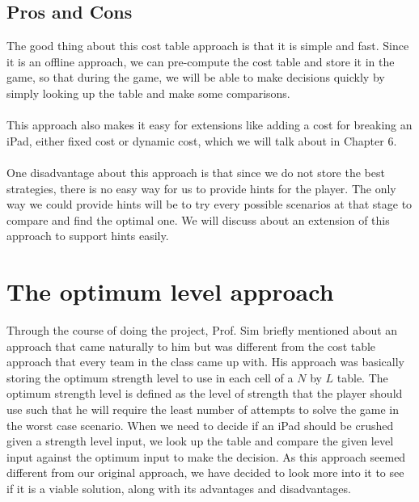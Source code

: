 \documentclass[12pt,a4paper,oneside]{report}
\begin{document}
\section{Pros and Cons}
The good thing about this cost table approach is that it is simple and fast. Since it is an offline approach, we can pre-compute the cost table and store it in the game, so that during the game, we will be able to make decisions quickly by simply looking up the table and make some comparisons. \\\\
This approach also makes it easy for extensions like adding a cost for breaking an iPad, either fixed cost or dynamic cost, which we will talk about in Chapter 6. \\\\
One disadvantage about this approach is that since we do not store the best strategies, there is no easy way for us to provide hints for the player. The only way we could provide hints will be to try every possible scenarios at that stage to compare and find the optimal one. We will discuss about an extension of this approach to support hints easily.


\chapter{The optimum level approach}
Through the course of doing the project, Prof. Sim briefly mentioned about an approach that came naturally to him but was different from the cost table approach that every team in the class came up with. His approach was basically storing the optimum strength level to use in each cell of a $N$ by $L$ table. The optimum strength level is defined as the level of strength that the player should use such that he will require the least number of attempts to solve the game in the worst case scenario. When we need to decide if an iPad should be crushed given a strength level input, we look up the table and compare the given level input against the optimum input to make the decision. As this approach seemed different from our original approach, we have decided to look more into it to see if it is a viable solution, along with its advantages and disadvantages.
\end{document}
